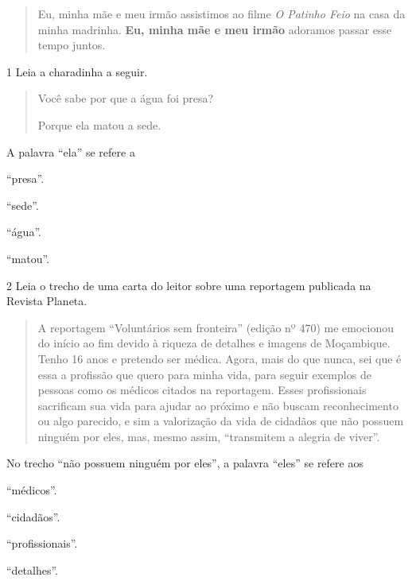 \begin{quote}
Eu, minha mãe e meu irmão assistimos ao filme \textit{O Patinho Feio} na
casa da minha madrinha. \textbf{Eu, minha mãe e meu irmão} adoramos passar
esse tempo juntos.
\end{quote}



\num{1} Leia a charadinha a seguir.

\begin{quote}
Você sabe por que a água foi presa?

Porque ela matou a sede.
\end{quote}

A palavra ``ela'' se refere a

\begin{escolha}
\item ``presa''.

\item ``sede''.

\item ``água''.

\item ``matou''.
\end{escolha}

\num{2} Leia o trecho de uma carta do leitor sobre uma reportagem
publicada na Revista Planeta.

\begin{quote}
A reportagem ``Voluntários sem fronteira'' (edição nº 470) me emocionou
do início ao fim devido à riqueza de detalhes e imagens de Moçambique.
Tenho 16 anos e pretendo ser médica. Agora, mais do que nunca, sei que é
essa a profissão que quero para minha vida, para seguir exemplos de
pessoas como os médicos citados na reportagem. Esses profissionais
sacrificam sua vida para ajudar ao próximo e não buscam reconhecimento
ou algo parecido, e sim a valorização da vida de cidadãos que não
possuem ninguém por eles, mas, mesmo assim, ``transmitem a alegria de
viver''.

\end{quote}

No trecho ``não possuem ninguém por eles'', a palavra ``eles'' se refere
aos

\begin{escolha}
\item ``médicos''.

\item ``cidadãos''.

\item ``profissionais''.

\item ``detalhes''.
\end{escolha}



